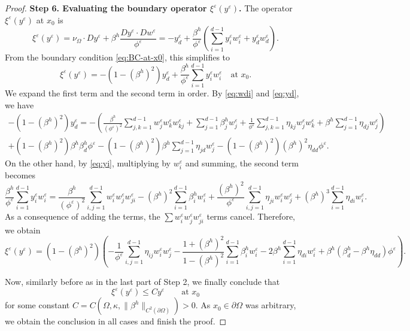 \documentclass[11pt]{article}
\numberwithin{equation}{section}
\def\le{\leqslant}
\begin{document}
\begin{proof}
\medskip

\textbf{Step 6. Evaluating the boundary operator $\xi^\varepsilon(y^\varepsilon)$.} The operator $\xi^\varepsilon(y^\varepsilon)$ at $x_0$ is
\[
\xi^\varepsilon(y^\varepsilon) = \nu_\Omega \cdot Dy^\varepsilon + \beta^h \frac{Dy^\varepsilon \cdot Dw^\varepsilon}{\phi^\varepsilon} = -y^\varepsilon_d + \frac{\beta^h}{\phi^\varepsilon}\left( \sum_{i=1}^{d-1} y^\varepsilon_i w^\varepsilon_i + y^\varepsilon_d w^\varepsilon_d \right).
\]
From the boundary condition \eqref{eq:BC-at-x0}, this simplifies to
\[
\xi^\varepsilon(y^\varepsilon) = -(1-(\beta^h)^2) y^\varepsilon_d + \frac{\beta^h}{\phi^\varepsilon} \sum_{i=1}^{d-1} y^\varepsilon_i w^\varepsilon_i\quad\text{at }x_0.
\]
We expand the first term and the second term in order. By \eqref{eq:wdi} and \eqref{eq:yd}, we have
\begin{multline*}
-(1-(\beta^h)^2) y^\varepsilon_d = -\left( \frac{\beta^h}{(\phi^\varepsilon)^2} \sum_{j,k=1}^{d-1} w^\varepsilon_j w^\varepsilon_k w^\varepsilon_{kj} + \sum_{j=1}^{d-1} \beta^h_j w^\varepsilon_j + \frac{1}{\phi^\varepsilon} \sum_{j,k=1}^{d-1} \eta_{kj} w^\varepsilon_j w^\varepsilon_k + \beta^h \sum_{j=1}^{d-1} \eta_{dj} w^\varepsilon_j \right) \\
+ (1-(\beta^h)^2)\beta^h \beta^h_d \phi^\varepsilon - (1-(\beta^h)^2)\beta^h \sum_{j=1}^{d-1} \eta_{jd} w^\varepsilon_j - (1-(\beta^h)^2)(\beta^h)^2 \eta_{dd} \phi^\varepsilon.
\end{multline*}
On the other hand, by \eqref{eq:yi}, multiplying by $w^\varepsilon_i$ and summing, the second term becomes
\[
\frac{\beta^h}{\phi^\varepsilon} \sum_{i=1}^{d-1} y^\varepsilon_i w^\varepsilon_i = \frac{\beta^h}{(\phi^\varepsilon)^2} \sum_{i,j=1}^{d-1} w^\varepsilon_i w^\varepsilon_j w^\varepsilon_{ji} - (\beta^h)^2 \sum_{i=1}^{d-1} \beta^h_i w^\varepsilon_i + \frac{(\beta^h)^2}{\phi^\varepsilon} \sum_{i,j=1}^{d-1} \eta_{ji} w^\varepsilon_i w^\varepsilon_j + (\beta^h)^3 \sum_{i=1}^{d-1} \eta_{di} w^\varepsilon_i.
\]
As a consequence of adding the terms, the $\sum w^\varepsilon_i w^\varepsilon_j w^\varepsilon_{ji}$ terms cancel. Therefore, we obtain
\[
\xi^\varepsilon(y^\varepsilon) = (1-(\beta^h)^2) \left( -\frac{1}{\phi^\varepsilon} \sum_{i,j=1}^{d-1} \eta_{ij} w^\varepsilon_i w^\varepsilon_j -\frac{1+(\beta^h)^2}{1-(\beta^h)^2} \sum_{i=1}^{d-1} \beta^h_i w^\varepsilon_i - 2\beta^h \sum_{i=1}^{d-1} \eta_{di} w^\varepsilon_i + \beta^h(\beta^h_d - \beta^h \eta_{dd})\phi^\varepsilon \right).
\]

Now, similarly before as in the last part of Step 2, we finally conclude that $$\xi^\varepsilon(y^\varepsilon) \le Cy^\varepsilon\qquad\text{at }x_0$$ for some constant $C=C(\Omega,\kappa,\|\beta^h\|_{C^2(\partial\Omega)})>0$. As $x_0\in\partial\Omega$ was arbitrary, we obtain the conclusion in all cases and finish the proof.
\end{proof}
\end{document}
